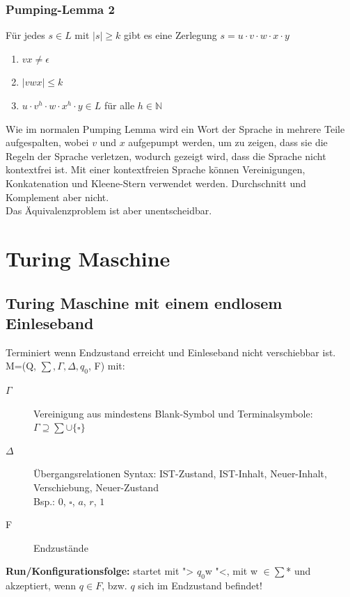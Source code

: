 \documentclass[12pt,a4paper]{article}
\begin{document}
	\subsubsection{Pumping-Lemma 2}
	Für jedes $s \in L$ mit $|s| \geq k$ gibt es eine Zerlegung $s = u \cdot v \cdot w \cdot x \cdot y$
	\begin{enumerate}
	\item $vx \neq \epsilon$
	\item $|vwx| \leq k$
	\item $u \cdot v^h \cdot w \cdot x^h \cdot y \in L $ für alle $h \in \mathbb{N}$
	\end{enumerate}
	Wie im normalen Pumping Lemma wird ein Wort der Sprache in mehrere Teile aufgespalten, wobei $v$ und $x$ aufgepumpt werden, um zu zeigen, dass sie die Regeln der Sprache verletzen, wodurch gezeigt wird, dass die Sprache nicht kontextfrei ist.\newline
	Mit einer kontextfreien Sprache können Vereinigungen, Konkatenation und Kleene-Stern verwendet werden. Durchschnitt und Komplement aber nicht.\\
	Das Äquivalenzproblem ist aber unentscheidbar.
	

\section{Turing Maschine}
	\subsection{Turing Maschine mit einem endlosem Einleseband}
	Terminiert wenn Endzustand erreicht und Einleseband nicht verschiebbar ist.\\
	M=(Q, $\sum, \Gamma , \Delta , q_0$, F) mit:\\
	\begin{description}
		\item[$\Gamma$] Vereinigung aus mindestens Blank-Symbol und Terminalsymbole: $\Gamma \supseteq \sum \cup \{ \square \} $
		\item[$\Delta$] Übergangsrelationen Syntax: IST-Zustand, IST-Inhalt, Neuer-Inhalt, Verschiebung, Neuer-Zustand\\ Bsp.: $0$,\hspace{.25cm} $\square$,\hspace{.25cm} $a$,\hspace{.25cm} $r$,\hspace{.25cm} $1$
		\item[F] Endzustände
	\end{description}
	\textbf{Run/Konfigurationsfolge:} startet mit "> $q_0$w "<, mit w $\in \sum$* und akzeptiert, wenn $q \in F$, bzw. $q$ sich im Endzustand befindet!
\end{document}
